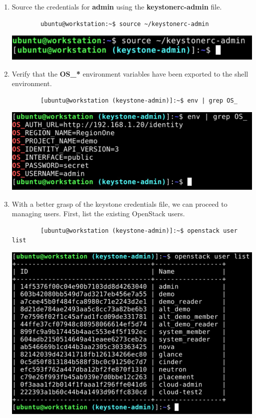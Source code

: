 \documentclass[letterpaper, 12pt]{article}
\begin{document}
\begin{enumerate}
    \item Source the credentials for \textbf{admin} using the \textbf{keystonerc-admin} file.
    \begin{lstlisting}
        ubuntu@workstation:~$ source ~/keystonerc-admin
    \end{lstlisting}

    \begin{center}
        \includegraphics[width=\linewidth]{images/part4/step3.png}
    \end{center}

    \item Verify that the \textbf{OS\_*} environment variables have been exported to the shell environment.
    \begin{lstlisting}
        [ubuntu@workstation (keystone-admin)]:~$ env | grep OS_
    \end{lstlisting}

    \begin{center}
        \includegraphics[width=\linewidth]{images/part4/step4.png}
    \end{center}

    \item With a better grasp of the keystone credentials file, we can proceed to managing users.
    First, list the existing OpenStack users.
    \begin{lstlisting}
        [ubuntu@workstation (keystone-admin)]:~$ openstack user list
    \end{lstlisting}

    \begin{center}
        \includegraphics[width=\linewidth]{images/part4/step5.png}
    \end{center}


\end{enumerate}
\end{document}
